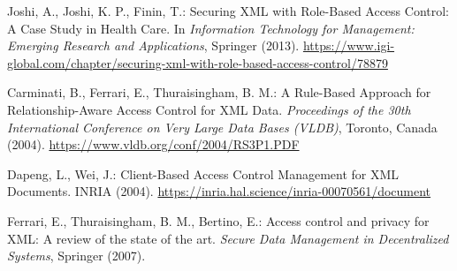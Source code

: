 \documentclass[runningheads]{llncs}
\begin{document}
\begin{spacing}{1.5}
\begin{thebibliography}{9}
    Joshi, A., Joshi, K. P., Finin, T.: Securing XML with Role-Based Access Control: A Case Study in Health Care. In \textit{Information Technology for Management: Emerging Research and Applications}, Springer (2013). \url{https://www.igi-global.com/chapter/securing-xml-with-role-based-access-control/78879}
    
    Carminati, B., Ferrari, E., Thuraisingham, B. M.: A Rule-Based Approach for Relationship-Aware Access Control for XML Data. \textit{Proceedings of the 30th International Conference on Very Large Data Bases (VLDB)}, Toronto, Canada (2004). \url{https://www.vldb.org/conf/2004/RS3P1.PDF}
    
    Dapeng, L., Wei, J.: Client-Based Access Control Management for XML Documents. INRIA (2004). \url{https://inria.hal.science/inria-00070561/document}
    
    Ferrari, E., Thuraisingham, B. M., Bertino, E.: Access control and privacy for XML: A review of the state of the art. \textit{Secure Data Management in Decentralized Systems}, Springer (2007). 
    
\end{thebibliography}
\end{spacing}
    
\end{document}
